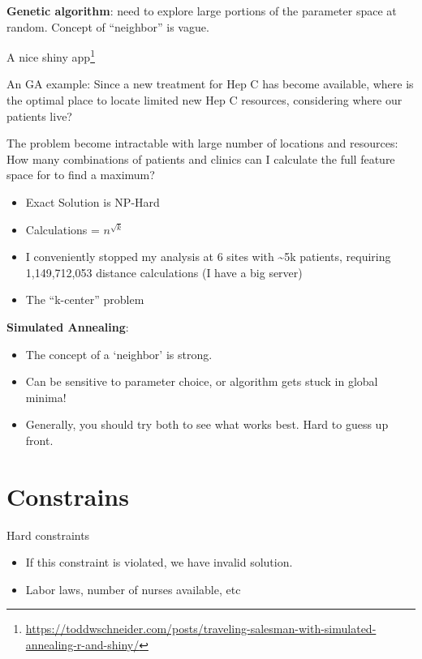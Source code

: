 \documentclass[fontset=fandol,zihao=false,scheme=chinese,heading=true,UTF8]{ctexbook}
\providecommand{\tightlist}{%
  \setlength{\itemsep}{0pt}\setlength{\parskip}{0pt}}
\renewcommand{\href}[2]{#2\footnote{\url{#1}}}
\begin{document}
\textbf{Genetic algorithm}: need to explore large portions of the parameter space at random. Concept of ``neighbor'' is vague.

\href{https://toddwschneider.com/posts/traveling-salesman-with-simulated-annealing-r-and-shiny/}{A nice shiny app}

An GA example: Since a new treatment for Hep C has become available, where is the optimal place to locate limited new Hep C resources, considering where our patients live?

The problem become intractable with large number of locations and resources: How many combinations of patients and clinics can I calculate the full feature space for to find a maximum?

\begin{itemize}
\tightlist
\item
  Exact Solution is NP-Hard
\item
  Calculations = \(n^{\sqrt{k}}\)
\item
  I conveniently stopped my analysis at 6 sites with \textasciitilde{}5k patients, requiring 1,149,712,053 distance calculations (I have a big server)
\item
  The ``k-center'' problem
\end{itemize}

\textbf{Simulated Annealing}:

\begin{itemize}
\tightlist
\item
  The concept of a `neighbor' is strong.
\item
  Can be sensitive to parameter choice, or algorithm gets stuck in global minima!
\item
  Generally, you should try both to see what works best. Hard to guess up front.
\end{itemize}

\hypertarget{constrains}{%
\section{Constrains}\label{constrains}}

Hard constraints

\begin{itemize}
\tightlist
\item
  If this constraint is violated, we have invalid solution.
\item
  Labor laws, number of nurses available, etc
\end{itemize}
\end{document}

